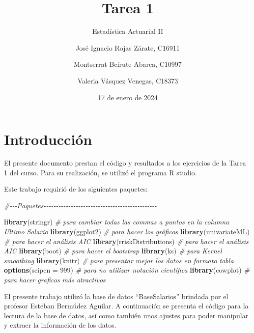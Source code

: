 \documentclass[
]{article}
\title{Tarea 1}
\subtitle{Estadística Actuarial II}
\author{José Ignacio Rojas Zárate, C16911 \and Montserrat Beirute
Abarca, C10997 \and Valeria Vásquez Venegas, C18373}
\date{17 de enero de 2024}
\newenvironment{Shaded}{\begin{snugshade}}{\end{snugshade}}
\newcommand{\AttributeTok}[1]{\textcolor[rgb]{0.13,0.29,0.53}{#1}}
\newcommand{\CommentTok}[1]{\textcolor[rgb]{0.56,0.35,0.01}{\textit{#1}}}
\newcommand{\DecValTok}[1]{\textcolor[rgb]{0.00,0.00,0.81}{#1}}
\newcommand{\FunctionTok}[1]{\textcolor[rgb]{0.13,0.29,0.53}{\textbf{#1}}}
\newcommand{\NormalTok}[1]{#1}
\begin{document}
\maketitle

{
\setcounter{tocdepth}{2}
\tableofcontents
}
\hypertarget{introducciuxf3n}{%
\section{Introducción}\label{introducciuxf3n}}

El presente documento prestan el código y resultados a los ejercicios de
la Tarea 1 del curso. Para su realización, se utilizó el programa R
studio.

Este trabajo requirió de los siguientes paquetes:

\begin{Shaded}
\begin{Highlighting}[]
\CommentTok{\#{-}{-}{-}Paquetes{-}{-}{-}{-}{-}{-}{-}{-}{-}{-}{-}{-}{-}{-}{-}{-}{-}{-}{-}{-}{-}{-}{-}{-}{-}{-}{-}{-}{-}{-}{-}{-}{-}{-}{-}{-}{-}{-}{-}{-}{-}{-}{-}{-}{-}{-}}

\FunctionTok{library}\NormalTok{(stringr) }\CommentTok{\# para cambiar todas las commas a puntos en la columna Ultimo Salario}
\FunctionTok{library}\NormalTok{(ggplot2) }\CommentTok{\# para hacer los gráficos}
\FunctionTok{library}\NormalTok{(univariateML) }\CommentTok{\# para hacer el análisis AIC}
\FunctionTok{library}\NormalTok{(rriskDistributions) }\CommentTok{\# para hacer el análisis AIC}
\FunctionTok{library}\NormalTok{(boot) }\CommentTok{\# para hacer el bootstrap}
\FunctionTok{library}\NormalTok{(ks) }\CommentTok{\# para Kernel smoothing}
\FunctionTok{library}\NormalTok{(knitr) }\CommentTok{\# para presentar mejor los datos en formato tabla}
\FunctionTok{options}\NormalTok{(}\AttributeTok{scipen =} \DecValTok{999}\NormalTok{) }\CommentTok{\# para no utilizar notación científica}
\FunctionTok{library}\NormalTok{(cowplot) }\CommentTok{\# para hacer graficos más atractivos}
\end{Highlighting}
\end{Shaded}

El presente trabajo utilizó la base de datos ``BaseSalarios'' brindada
por el profesor Esteban Bermúdez Aguilar. A continuación se presenta el
código para la lectura de la base de datos, así como también unos
ajustes para poder manipular y extraer la información de los datos.
\end{document}
